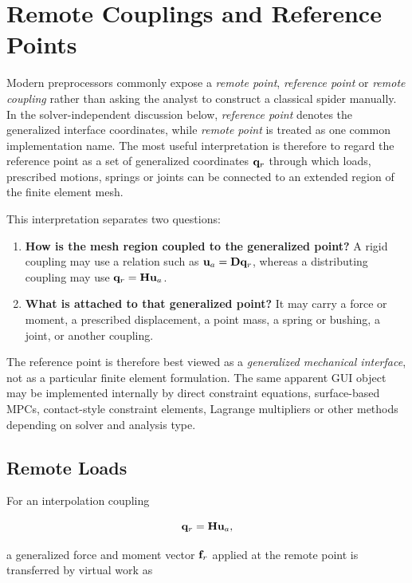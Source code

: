 \section{Remote Couplings and Reference Points}\label{sec:remote-couplings}

Modern preprocessors commonly expose a \textit{remote point}, \textit{reference
point} or \textit{remote coupling} rather than asking the analyst to construct a
classical spider manually. In the solver-independent discussion below,
\textit{reference point} denotes the generalized interface coordinates, while
\textit{remote point} is treated as one common implementation name. The most
useful interpretation is therefore to regard the reference point as a set of
generalized coordinates $\mathbf{q}_r$ through which loads, prescribed motions,
springs or joints can be connected to an extended region of the finite element
mesh.

This interpretation separates two questions:

\begin{enumerate}
    \item \textbf{How is the mesh region coupled to the generalized point?}
          A rigid coupling may use a relation such as
          $\mathbf{u}_a=\mathbf{D}\mathbf{q}_r$, whereas a distributing coupling may use
          $\mathbf{q}_r=\mathbf{H}\mathbf{u}_a$.
    \item \textbf{What is attached to that generalized point?}
          It may carry a force or moment, a prescribed displacement, a point
          mass, a spring or bushing, a joint, or another coupling.
\end{enumerate}

The reference point is therefore best viewed as a \emph{generalized mechanical
interface}, not as a particular finite element formulation. The same apparent
GUI object may be implemented internally by direct constraint equations,
surface-based MPCs, contact-style constraint elements, Lagrange multipliers or
other methods depending on solver and analysis type.

\subsection{Remote Loads}

For an interpolation coupling

\begin{equation}
    \mathbf{q}_r=\mathbf{H}\mathbf{u}_a,
\end{equation}

a generalized force and moment vector $\mathbf{f}_r$ applied at the remote point is
transferred by virtual work as

